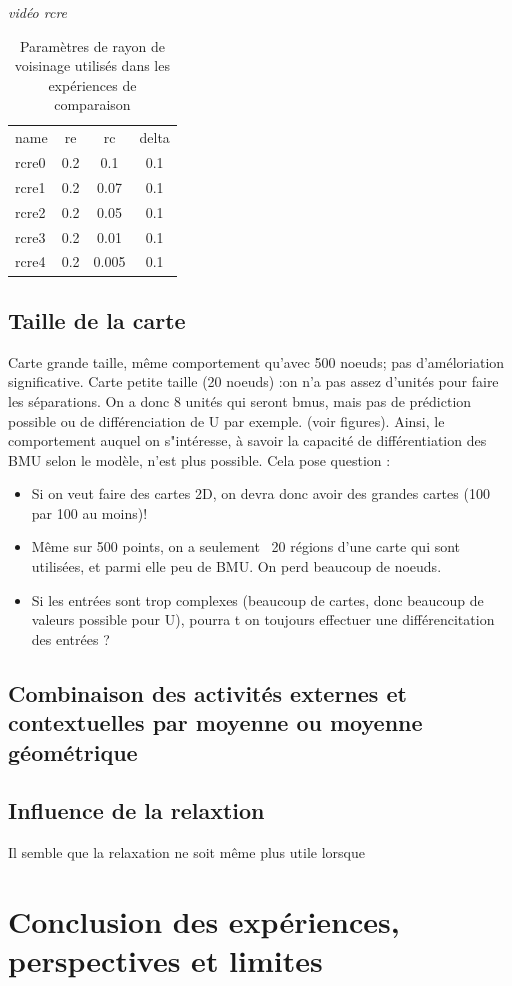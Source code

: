 \emph{vidéo rcre}
\begin{table}
\begin{tabular}{ l c c c }
 name & re & rc & delta\\ 
 rcre0 & 0.2 & 0.1 & 0.1\\  
 rcre1 & 0.2 & 0.07 & 0.1 \\
 rcre2 & 0.2 & 0.05 & 0.1 \\
 rcre3 & 0.2 & 0.01 & 0.1 \\
 rcre4 & 0.2 & 0.005 & 0.1
\end{tabular}
\caption{Paramètres de rayon de voisinage utilisés dans les expériences de comparaison}
\label{tab:rcre_params}
\end{table}

\subsection{Taille de la carte}

Carte grande taille, même comportement qu'avec 500 noeuds; pas d'améloriation significative.
Carte petite taille (20 noeuds) :on n'a pas assez d'unités pour faire les séparations. On a donc 8 unités qui seront bmus, mais pas de prédiction possible ou de différenciation de U par exemple. (voir figures).
Ainsi, le comportement auquel on s"intéresse, à savoir la capacité de différentiation des BMU selon le modèle, n'est plus possible. Cela pose question  :
\begin{itemize}
\item Si on veut faire des cartes 2D, on devra donc avoir des grandes cartes (100 par 100 au moins)! 
\item Même sur 500 points, on a seulement ~20 régions d'une carte qui sont utilisées, et parmi elle peu de BMU. On perd beaucoup de noeuds.
\item Si les entrées sont trop complexes (beaucoup de cartes, donc beaucoup de valeurs possible pour U), pourra t on toujours effectuer une différencitation des entrées ? 
\end{itemize}



\subsection{Combinaison des activités externes et contextuelles par moyenne ou moyenne géométrique}

\subsection{Influence de la relaxtion}

Il semble que la relaxation ne soit même plus utile lorsque 

\section{Conclusion des expériences, perspectives et limites}